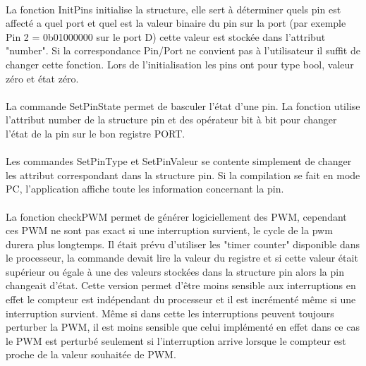 \paragraph{}
La fonction InitPins initialise la structure, elle sert à déterminer quels pin est affecté a quel port et quel est la valeur binaire du pin sur la port (par exemple Pin 2 = 0b01000000 sur le port D) cette valeur est stockée dans l'attribut "number". Si la correspondance Pin/Port ne convient pas à l'utilisateur il suffit de changer cette fonction. Lors de l'initialisation les pins ont pour type bool, valeur zéro et état zéro.

\paragraph{}
La commande SetPinState permet de basculer l'état d'une pin. La fonction utilise l'attribut number de la structure pin et des opérateur bit à bit pour changer l'état de la pin sur le bon registre PORT.

\paragraph{}
Les commandes SetPinType et SetPinValeur se contente simplement de changer les attribut correspondant dans la structure pin. Si la compilation se fait en mode PC, l'application affiche toute les information concernant la pin.

\paragraph{}
La fonction checkPWM permet de générer logiciellement des PWM, cependant ces PWM ne sont pas exact si une interruption survient, le cycle de la pwm durera plus longtemps. Il était prévu d'utiliser les "timer counter" disponible dans le processeur, la commande devait lire la valeur du registre et si cette valeur était supérieur ou égale à une des valeurs stockées dans la structure pin alors la pin changeait d'état. Cette version permet d'être moins sensible aux interruptions en effet le compteur est indépendant du processeur et il est incrémenté même si une interruption survient. Même si dans cette les interruptions peuvent toujours perturber la PWM, il est moins sensible que celui implémenté en effet dans ce cas le PWM est perturbé seulement si l'interruption arrive lorsque le compteur est proche de la valeur souhaitée de PWM. 
